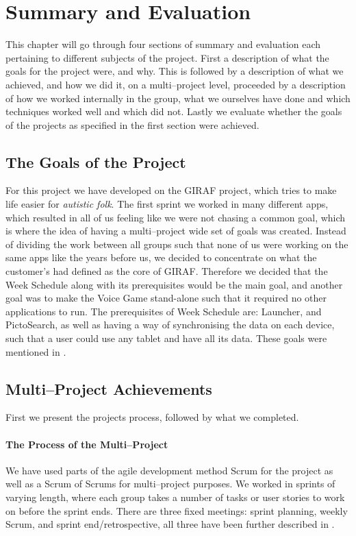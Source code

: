 \chapter{Summary and Evaluation}
This chapter will go through four sections of summary and evaluation each pertaining to different subjects of the project.
First a description of what the goals for the project were, and why.
This is followed by a description of what we achieved, and how we did it, on a multi--project level, proceeded by a description of how we worked internally in the group, what we ourselves have done and which techniques worked well and which did not.
Lastly we evaluate whether the goals of the projects as specified in the first section were achieved.

\section{The Goals of the Project}

For this project we have developed on the GIRAF project, which tries to make life easier for \textit{autistic folk}.
The first sprint we worked in many different apps, which resulted in all of us feeling like we were not chasing a common goal, which is where the idea of having a multi--project wide set of goals was created.
Instead of dividing the work between all groups such that none of us were working on the same apps like the years before us, we decided to concentrate on what the customer's had defined as the core of GIRAF.
Therefore we decided that the Week Schedule along with its prerequisites would be the main goal, and another goal was to make the Voice Game stand-alone such that it required no other applications to run.
The prerequisites of Week Schedule are: Launcher, and PictoSearch, as well as having a way of synchronising the data on each device, such that a user could use any tablet and have all its data.
These goals were mentioned in .

\section{Multi--Project Achievements}
First we present the projects process, followed by what we completed.

\subsubsection*{The Process of the Multi--Project}
We have used parts of the agile development method Scrum for the project as well as a Scrum of Scrums for multi--project purposes.
We worked in sprints of varying length, where each group takes a number of tasks or user stories to work on before the sprint ends.
There are three fixed meetings: sprint planning, weekly Scrum, and sprint end/retrospective, all three have been further described in .

